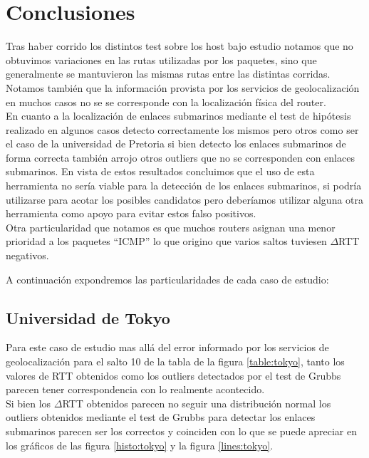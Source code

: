 \section{Conclusiones}

Tras haber corrido los distintos test sobre los host bajo estudio notamos que no obtuvimos variaciones en las rutas utilizadas por los paquetes, sino que generalmente se mantuvieron las mismas rutas entre las distintas corridas. 
Notamos también que la información provista por los servicios de geolocalización en muchos casos no se se corresponde con la localización física del router.\\
En cuanto a la localización de enlaces submarinos mediante el test de hipótesis realizado en algunos casos detecto correctamente los mismos pero otros como ser el caso de la universidad de Pretoria si bien detecto los enlaces submarinos de forma correcta también arrojo otros outliers que no se corresponden con enlaces submarinos. En vista de estos resultados concluimos que el uso de esta herramienta no sería viable para la detección de los enlaces submarinos, si podría utilizarse para acotar los posibles candidatos pero deberíamos utilizar alguna otra herramienta como apoyo para evitar estos falso positivos.\\
Otra particularidad que notamos es que muchos routers asignan una menor prioridad a los paquetes ``ICMP'' lo que origino que varios saltos tuviesen $\Delta$RTT negativos.

A continuación expondremos las particularidades de cada caso de estudio:

\subsection{Universidad de Tokyo}

Para este caso de estudio mas allá del error informado por los servicios de geolocalización para el salto 10 de la tabla de la figura \ref{table:tokyo}, tanto los valores de RTT obtenidos como los outliers detectados por el test de Grubbs parecen tener correspondencia con lo realmente acontecido.\\
Si bien los $\Delta$RTT obtenidos parecen no seguir una distribución normal los outliers obtenidos mediante el test de Grubbs para detectar los enlaces submarinos parecen ser los correctos y coinciden con lo que se puede apreciar en los gráficos de las figura \ref{histo:tokyo} y la figura \ref{lines:tokyo}.

